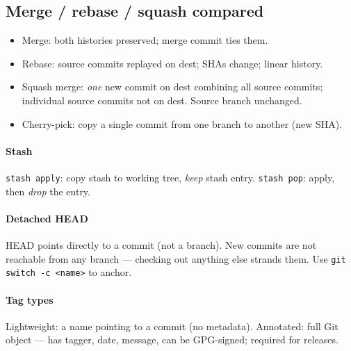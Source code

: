 \subsection{Merge / rebase / squash compared}
\begin{itemize}
  \item \textcolor{Bittersweet}{Merge}: both histories preserved; merge commit ties them.
  \item \textcolor{Bittersweet}{Rebase}: source commits replayed on dest; SHAs change; linear history.
  \item \textcolor{Bittersweet}{Squash merge}: \emph{one} new commit on dest combining all source commits; individual source commits not on dest. Source branch unchanged.
  \item \textcolor{Bittersweet}{Cherry-pick}: copy a single commit from one branch to another (new SHA).
\end{itemize}

\paragraph{Stash}
\textcolor{Bittersweet}{\texttt{stash apply}}: copy stash to working tree, \emph{keep} stash entry. \textcolor{Bittersweet}{\texttt{stash pop}}: apply, then \emph{drop} the entry.

\paragraph{Detached HEAD}
HEAD points directly to a commit (not a branch). New commits are \textcolor{Bittersweet}{not reachable} from any branch — checking out anything else strands them. Use \texttt{git switch -c <name>} to anchor.

\paragraph{Tag types}
\textcolor{Bittersweet}{Lightweight}: a name pointing to a commit (no metadata).
\textcolor{Bittersweet}{Annotated}: full Git object — has tagger, date, message, can be GPG-signed; required for releases.
